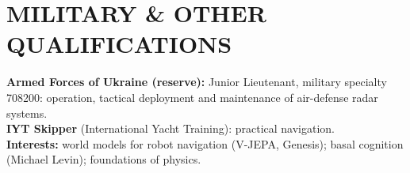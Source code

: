 \documentclass[11pt,a4paper]{article}
\begin{document}
\section*{MILITARY \& OTHER QUALIFICATIONS}
\textbf{Armed Forces of Ukraine (reserve):} Junior Lieutenant, military specialty 708200: operation, tactical deployment and maintenance of air-defense radar systems.\\
\textbf{IYT Skipper} (International Yacht Training): practical navigation.\\
\textbf{Interests:} world models for robot navigation (V-JEPA, Genesis); basal cognition (Michael Levin); foundations of physics.
\end{document}
